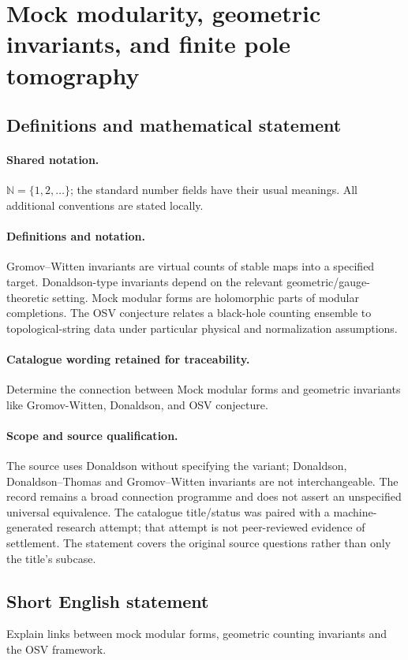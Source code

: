 \documentclass[11pt]{article}
\begin{document}
\section{Mock modularity, geometric invariants, and finite pole tomography}\label{statement}

\subsection{Definitions and mathematical statement}

\paragraph{Shared notation.}$\mathbb N=\{1,2,\ldots\}$; the standard number fields have their usual meanings. All additional conventions are stated locally.


\paragraph{Definitions and notation.}Gromov--Witten invariants are virtual counts of stable maps into a specified target. Donaldson-type invariants depend on the relevant geometric/gauge-theoretic setting. Mock modular forms are holomorphic parts of modular completions. The OSV conjecture relates a black-hole counting ensemble to topological-string data under particular physical and normalization assumptions.

\paragraph{Catalogue wording retained for traceability.}
Determine the connection between Mock modular forms and geometric invariants like Gromov-Witten, Donaldson, and OSV conjecture.
\paragraph{Scope and source qualification.}The source uses Donaldson without specifying the variant; Donaldson, Donaldson–Thomas and Gromov–Witten invariants are not interchangeable. The record remains a broad connection programme and does not assert an unspecified universal equivalence. The catalogue title/status was paired with a machine-generated research attempt; that attempt is not peer-reviewed evidence of settlement. The statement covers the original source questions rather than only the title’s subcase.
\subsection{Short English statement}
Explain links between mock modular forms, geometric counting invariants and the OSV framework.
\end{document}
